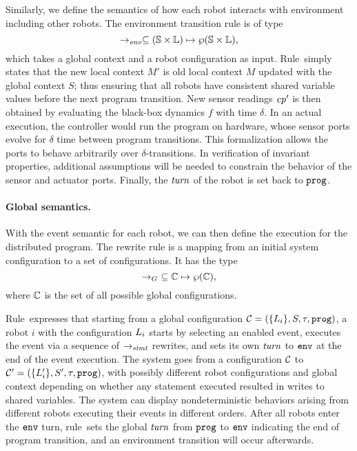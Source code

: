Similarly, we define the semantics of how each robot interacts with environment including other robots.
The environment transition rule is of type
\[
\rightarrow_\mathit{env} \subseteq (\mathbb{S} \times \mathbb{L}) \mapsto \wp(\mathbb{S}\times \mathbb{L}),
\]
which takes a global context and a robot configuration as input.
Rule~\RobotEnvRule simply states that the new local context $M'$ is
old local context $M$ updated with the global context $S$;
thus ensuring that all robots have consistent shared variable values before the next program transition.
New sensor readings $\mathit{cp}'$ is then obtained by evaluating the black-box dynamics $f$ with time $\delta$.
In an actual execution, the controller would run the program on hardware,
whose sensor ports evolve for $\delta$ time between program transitions.
This formalization allows the ports to behave arbitrarily over $\delta$-transitions.
In verification of invariant properties,
additional assumptions will be needed to constrain the behavior of the sensor and actuator ports.
Finally, the $\mathit{turn}$ of the robot is set back to $\mathtt{prog}$.


\paragraph{Global semantics.}

With the event semantic for each robot, we can then define the execution for the distributed \lgname program.
The rewrite rule is a mapping from an initial system configuration to a set of configurations.
It has the type
\[
\rightarrow_G\ \subseteq \mathbb{C} \mapsto \wp(\mathbb{C}),
\]
where $\mathbb{C}$ is the set of all possible global configurations.

Rule~\EventTransRule expresses that starting from a global configuration $\mathcal{C} = (\{L_{i}\}, S, \tau, \mathtt{prog})$,
a robot $i$ with the configuration $L_{i}$ starts by selecting an enabled event,
executes the event via a sequence of $\rightarrow_\mathit{stmt}$ rewrites,
and sets its own $\mathit{turn}$ to $\mathtt{env}$ at the end of the event execution.
The system goes from a configuration $\mathcal{C}$ to $\mathcal{C}^{\prime}= (\{L_{i}^\prime\}, S^{\prime}, \tau, \mathtt{prog})$,
with possibly different robot configurations and global context depending on
whether any statement executed resulted in writes to shared variables.
The system can display nondeterministic behaviors arising from different robots executing their events in different orders.
After all robots enter the $\mathtt{env}$ turn, rule~\EndProgTransRule sets the global $\mathit{turn}$ from $\mathtt{prog}$ to $\mathtt{env}$
indicating the end of program transition, and an environment transition will occur afterwards.

